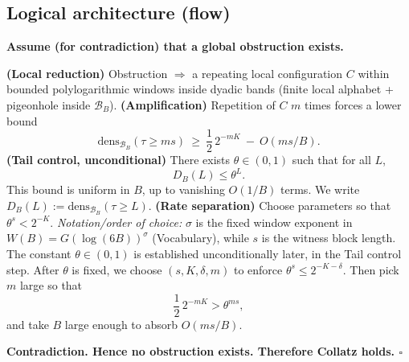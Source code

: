 \documentclass[preprint,12pt]{elsarticle}
\newcommand{\densB}[2]{\mathrm{dens}_{#1}\!\left(#2\right)}
\begin{document}
\subsection*{Logical architecture (flow)}
\begin{center}
\textbf{Assume (for contradiction) that a global obstruction exists.}
\end{center}
\vspace{0.2em}
\medskip
\noindent\textbf{(Local reduction)} Obstruction $\Rightarrow$ a repeating local configuration $C$
within bounded polylogarithmic windows inside dyadic bands
(finite local alphabet + pigeonhole inside $\mathcal{B}_B$).
\medskip
\noindent\textbf{(Amplification)} Repetition of $C$ $m$ times forces a lower bound
\[
\densB{\mathcal{B}_B}{\tau \ge ms}\ \ge\ \frac12\,2^{-mK}\ -\ O(ms/B).
\]
\medskip
\noindent\textbf{(Tail control, unconditional)} There exists $\theta\in(0,1)$ such that for all $L$,
\[
D_B(L)\le\theta^{L}.
\]
\noindent This bound is uniform in \(B\), up to vanishing \(O(1/B)\) terms.
\noindent We write \(D_B(L):=\densB{\mathcal{B}_B}{\tau \ge L}\).
\medskip
\noindent\textbf{(Rate separation)} Choose parameters so that $\theta^{s} < 2^{-K}$.
\noindent\emph{Notation/order of choice:}
$\sigma$ is the fixed window exponent in $W(B)=G(\log(6B))^{\sigma}$ (Vocabulary),
while $s$ is the witness block length.
The constant $\theta\in(0,1)$ is established unconditionally later,
in the Tail control step.
After $\theta$ is fixed, we choose $(s,K,\delta,m)$ to enforce
$\theta^s\le 2^{-K-\delta}$.
Then pick $m$ large so that
\[
\frac12\,2^{-mK} > \theta^{ms},
\]
and take $B$ large enough to absorb $O(ms/B)$.
\medskip
\begin{center}
\textbf{Contradiction. Hence no obstruction exists. Therefore Collatz holds. $\square$}
\end{center}
\end{document}
